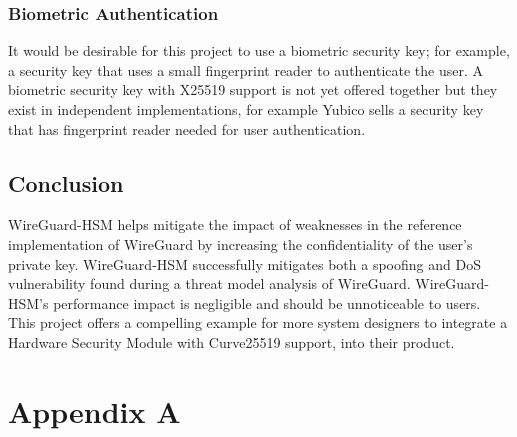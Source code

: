 \documentclass [11pt, proquest] {uwthesis}[2020/02/24]
\begin{document}
\subsection{Biometric Authentication}
It would be desirable for this project to use a biometric security key; for example, a security key that uses a small fingerprint reader to authenticate the user. A biometric security key with X25519 support is not yet offered together but they exist in independent implementations, for example Yubico sells a security key that has fingerprint reader needed for user authentication\cite{yubico_yubikey_2022}. 

\section{Conclusion}
WireGuard-HSM helps mitigate the impact of weaknesses in the reference implementation of WireGuard by increasing the confidentiality of the user's private key. WireGuard-HSM successfully mitigates both a spoofing and DoS vulnerability found during a threat model analysis of WireGuard.
WireGuard-HSM's performance impact is negligible and should be unnoticeable to users.
This project offers a compelling example for more system designers to integrate a Hardware Security Module with Curve25519 support, into their product.





\appendix

\chapter{Appendix A}
\end{document}
